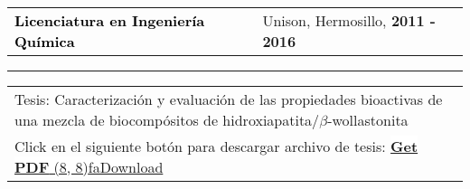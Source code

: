 \documentclass[10pt,A4]{article}
\newcommand{\mpwidth}{\linewidth-\fboxsep-\fboxsep}
\newcommand{\tzlarrow}{(0,0) -- (0.2,0) -- (0.3,0.2) -- (0.2,0.4) -- (0,0.4) -- (0.1,0.2) -- cycle;}
\newcommand{\larrow}[1]
{\begin{tikzpicture}[scale=0.58]
	 \filldraw[fill=#1!100,draw=#1!100!black]  \tzlarrow
 \end{tikzpicture}
}
\newcommand{\cvevent}[5]
{
\vspace{8pt}
	\begin{tabular*}{1\mpwidth}{p{0.55\mpwidth}  x{0.42\mpwidth}}
 	\textcolor{black}{\textbf{#2}} & \textcolor{softcol}{#3}, \textcolor{bgcol}{\textbf{#1}} 

	\end{tabular*}
\vspace{-12pt}
\textcolor{softcol}{\hrule}
\vspace{6pt}
	\begin{tabular*}{0.5\mpwidth}{p{\mpwidth}}
\larrow{softcol}  #4\\[3pt]
\larrow{softcol}  #5\\[6pt]
	\end{tabular*}

}
\newcommand{\icon}[3]{\makebox(#2, #2){\textcolor{#3}{\csname fa#1\endcsname}}}	%
\begin{document}
{\begin{minipage}[c][0.96\textheight][t]{0.7\linewidth}
		
		\cvevent{2011 - 2016}{Licenciatura en Ingenier\'ia Qu\'imica}{Unison, Hermosillo}{
			Tesis: Caracterizaci\'on y evaluaci\'on de las propiedades bioactivas de una mezcla de biocomp\'ositos de hidroxiapatita/$\beta$-wollastonita
		}
		{
			Click en el siguiente bot\'on para descargar archivo de tesis: \hspace{10.5mm} \href{http://www.repositorioinstitucional.uson.mx/handle/unison/1840}{\colorbox{bgcol}{\colorbox{white}{\textcolor{bgcol}{\hspace{3mm}\textbf{Get PDF}} \hspace{1.5mm} \icon{Download}{8}{bgcol}\hspace{3mm}}}}
		}
		
		
\end{minipage}}%
\end{document}
